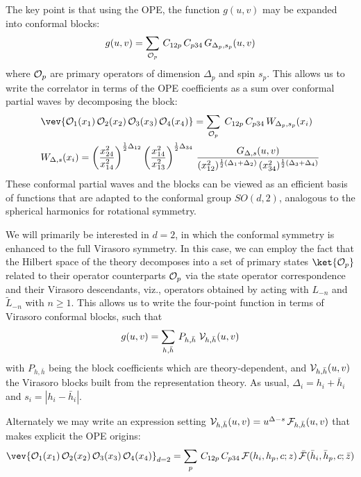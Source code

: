 \documentclass[12pt,openany]{book}
\begin{document}
The key point is that using the OPE, the function $g(u,v)$ may be expanded into conformal blocks:
%
\begin{equation}
g(u,v) = \sum_{{\cal O}_p} \, C_{12p} \, C_{p34} \, G_{\Delta_p,s_p} (u,v)
\label{}
\end{equation}
%
where ${\cal O}_p$ are primary operators of dimension $\Delta_p$ and spin $s_p$. This allows us to write the correlator in terms of the OPE coefficients as a sum over conformal partial waves by decomposing the block:
%
\begin{equation}
\begin{split}
&\vev{{\cal O}_1(x_1)\, {\cal O}_2(x_2)\,{\cal O}_3(x_3)\,{\cal O}_4(x_4)} = \sum_{{\cal O}_p} \; C_{12p} \, C_{p34} \, W_{\Delta_p,s_p}(x_i ) \\
& W_{\Delta,s}(x_i ) = \left(\frac{x_{24}^2}{x_{14}^2}\right)^{\frac{1}{2} \Delta_{12}}
 \left(\frac{x_{14}^2}{x_{13}^2}\right)^{\frac{1}{2} \Delta_{34}} \,
 \frac{G_{\Delta,s} (u,v) } {(x_{12}^2)^{\frac{1}{2} (\Delta_1+\Delta_2)}   \, (x_{34}^2)^{\frac{1}{2} (\Delta_3+\Delta_4)}   }
\end{split}
\label{}
\end{equation}
%
These conformal partial waves and the blocks can be viewed as an efficient basis of functions that are adapted to the conformal group $SO(d,2)$, analogous to the spherical harmonics for rotational symmetry.

We will primarily be interested in $d=2$, in which the conformal symmetry is enhanced to the full Virasoro symmetry. In this case, we can employ the fact that the Hilbert space of the theory decomposes into a set of primary states $\ket{{\cal O}_p}$  related to their operator counterparts ${\cal O}_p$ via the state operator correspondence and their Virasoro descendants, viz., operators obtained by acting with $L_{-n}$ and $\tilde{L}_{-n}$ with $n \geq1$. This allows us to write the four-point function in terms of Virasoro conformal blocks, such that
%
\begin{equation}
g(u,v) = \sum_{h,\bar{h}} \, P_{h, \bar{h}} \; {\cal V}_{h,\bar{h}}(u,v)
\label{}
\end{equation}
%
with $P_{h, \bar{h}} $ being the block coefficients which are theory-dependent, and ${\cal V}_{h,\bar{h}}(u,v)$ the Virasoro blocks built from the representation theory. As usual,  $\Delta_i = h_i+\bar{h}_i$ and $s_i = |h_i - \bar{h}_i|$.

 Alternately we may write an expression setting ${\cal V}_{h,\bar{h}}(u,v) = u^{\Delta-s} \, {\cal F}_{h,\bar{h}} (u,v)$
that makes explicit the OPE origins:
%
\begin{equation}
\vev{{\cal O}_1(x_1)\, {\cal O}_2(x_2)\,{\cal O}_3(x_3)\,{\cal O}_4(x_4)}_{d=2}
= \sum_p \, C_{12p} \, C_{p34} \, {\cal F}(h_i,h_p,c; z)
\,  \bar{{\cal F}}(\bar{h}_i, \bar{h}_p,c; {\bar z})
\label{eq:virblocks}
\end{equation}
%
\end{document}
